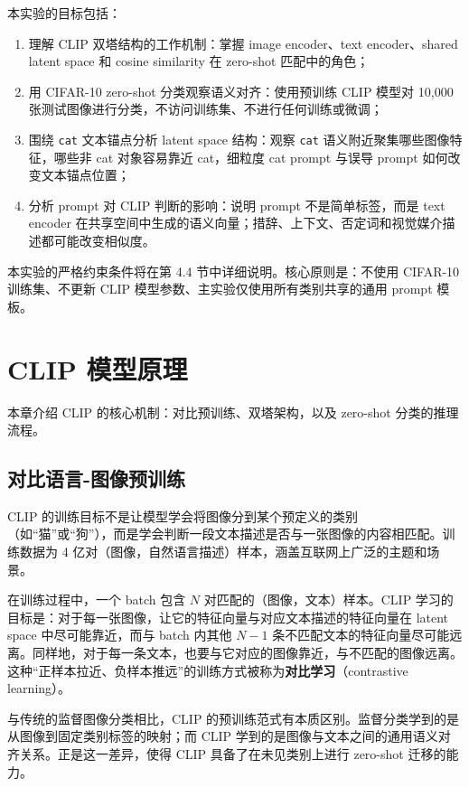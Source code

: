 \documentclass[12pt,a4paper]{ctexart}
\begin{document}
本实验的目标包括：
\begin{enumerate}[label=(\arabic*)]
    \item 理解 CLIP 双塔结构的工作机制：掌握 image encoder、text encoder、shared latent space 和 cosine similarity 在 zero-shot 匹配中的角色；
    \item 用 CIFAR-10 zero-shot 分类观察语义对齐：使用预训练 CLIP 模型对 10,000 张测试图像进行分类，不访问训练集、不进行任何训练或微调；
    \item 围绕 \texttt{cat} 文本锚点分析 latent space 结构：观察 \texttt{cat} 语义附近聚集哪些图像特征，哪些非 cat 对象容易靠近 cat，细粒度 cat prompt 与误导 prompt 如何改变文本锚点位置；
    \item 分析 prompt 对 CLIP 判断的影响：说明 prompt 不是简单标签，而是 text encoder 在共享空间中生成的语义向量；措辞、上下文、否定词和视觉媒介描述都可能改变相似度。
\end{enumerate}

本实验的严格约束条件将在第 4.4 节中详细说明。核心原则是：不使用 CIFAR-10 训练集、不更新 CLIP 模型参数、主实验仅使用所有类别共享的通用 prompt 模板。

\section{CLIP 模型原理}

本章介绍 CLIP 的核心机制：对比预训练、双塔架构，以及 zero-shot 分类的推理流程。

\subsection{对比语言-图像预训练}

CLIP 的训练目标不是让模型学会将图像分到某个预定义的类别（如“猫”或“狗”），而是学会判断一段文本描述是否与一张图像的内容相匹配。训练数据为 4 亿对（图像，自然语言描述）样本，涵盖互联网上广泛的主题和场景。

在训练过程中，一个 batch 包含 $N$ 对匹配的（图像，文本）样本。CLIP 学习的目标是：对于每一张图像，让它的特征向量与对应文本描述的特征向量在 latent space 中尽可能靠近，而与 batch 内其他 $N-1$ 条不匹配文本的特征向量尽可能远离。同样地，对于每一条文本，也要与它对应的图像靠近，与不匹配的图像远离。这种“正样本拉近、负样本推远”的训练方式被称为\textbf{对比学习}（contrastive learning）。

与传统的监督图像分类相比，CLIP 的预训练范式有本质区别。监督分类学到的是从图像到固定类别标签的映射；而 CLIP 学到的是图像与文本之间的通用语义对齐关系。正是这一差异，使得 CLIP 具备了在未见类别上进行 zero-shot 迁移的能力。
\end{document}
